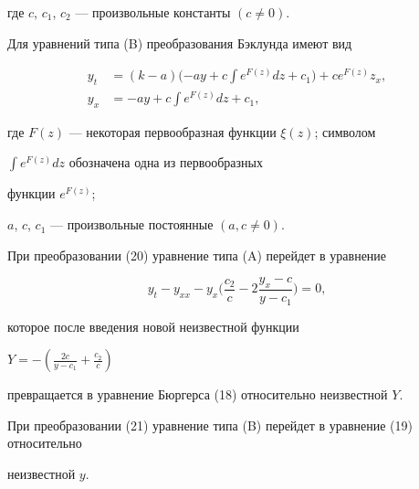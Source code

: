 где $c$, $c_1$, $c_2$ --- произвольные константы $({c \ne 0})$.





Для уравнений типа (B) преобразования Бэклунда имеют вид


\begin{equation}


\begin{split}


y_t&=({k-a}) \bigg({-ay+c\int


{e^{F (z)} dz+c_1}}\bigg)+ce^{F (z)} z_x, \\


y_x&=- ay+c\int {e^{F (z)} dz+c_1}, 


\end{split} 


\end{equation}


где $F (z )$ --- некоторая первообразная функции $\xi (z)$; символом


$\displaystyle\int{e^{F (z)} dz}$ обозначена одна из первообразных 


функции $e^{F (z)}$;


$a$, $c$, $c_1$ --- произвольные постоянные $ ({a,c \ne 0})$.





При преобразовании (20) уравнение типа (A) перейдет в уравнение


$$


y_t-y_{xx}-y_x \bigg({\frac{{c_2}}{c}-2\frac{{y_x-c}}{{y-c_1}}}\bigg)=0,


$$


которое после введения новой неизвестной функции 


$Y = -({\frac{{2c}}{{y-c_1}}+\frac{{c_2}}{c}})$


превращается в уравнение Бюргерса (18) относительно неизвестной $Y$.


При преобразовании (21) уравнение типа (B) перейдет в уравнение (19) относительно


неизвестной $y$.





